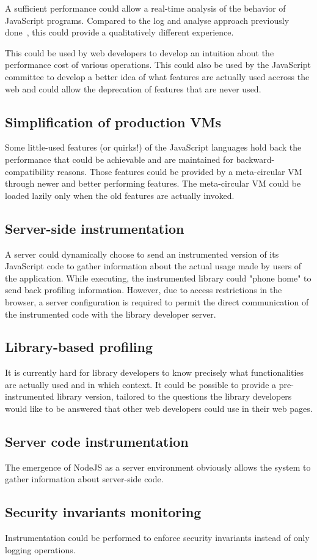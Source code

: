 A sufficient performance could allow a real-time analysis of the behavior of
JavaScript programs. Compared to the log and analyse approach previously
done~\cite{behavior_js}, this could provide a qualitatively different
experience.

This could be used by web developers to develop an intuition about the
performance cost of various operations. This could also be used by the
JavaScript committee to develop a better idea of what features are actually
used accross the web and could allow the deprecation of features that are never
used.

\subsection{Simplification of production VMs}

Some little-used features (or quirks!) of the JavaScript languages hold back
the performance that could be achievable and are maintained for
backward-compatibility reasons. Those features could be provided by a
meta-circular VM through newer and better performing features.  The
meta-circular VM could be loaded lazily only when the old features are actually
invoked.

\subsection{Server-side instrumentation}

A server could dynamically choose to send an instrumented version of its
JavaScript code to gather information about the actual usage made by users of
the application. While executing, the instrumented library could "phone home"
to send back profiling information. However, due to access restrictions in the
browser, a server configuration is required to permit the direct communication
of the instrumented code with the library developer server.

\subsection{Library-based profiling}

It is currently hard for library developers to know precisely what
functionalities are actually used and in which context. It could be possible to
provide a pre-instrumented library version, tailored to the questions the
library developers would like to be answered that other web developers could
use in their web pages. 

\subsection{Server code instrumentation}

The emergence of NodeJS as a server environment obviously allows the system to
gather information about server-side code.

\subsection{Security invariants monitoring}

Instrumentation could be performed to enforce security invariants instead of
only logging operations. 
